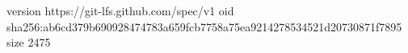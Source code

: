 version https://git-lfs.github.com/spec/v1
oid sha256:ab6cd379b690928474783a659fcb7758a75ea9214278534521d20730871f7895
size 2475
